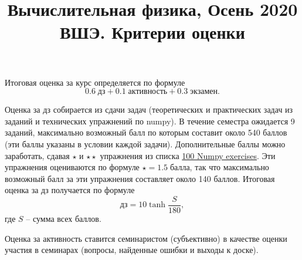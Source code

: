 \documentclass[prb,papersize=a4paper,notitlepage]{revtex4-1}%
\begin{document}
\title{Вычислительная физика, Осень 2020 ВШЭ. Критерии оценки}
\maketitle
Итоговая оценка за курс определяется по формуле $$0.6\;\textrm{дз} + 0.1\;\textrm{активность} + 0.3\;\textrm{экзамен}.$$

Оценка за дз собирается из сдачи задач (теоретических и практических задач из заданий и технических упражнений по numpy). В течение семестра ожидается 9 заданий, максимально возможный балл по которым составит около 540 баллов (эти баллы указаны в условии каждой задачи). Дополнительные баллы можно заработать, сдавая $\star$ и $\star\star$ упражнения из списка \href{https://github.com/rougier/numpy-100/blob/master/100_Numpy_exercises.md}{100 Numpy exercises}. Эти упражнения оцениваются по формуле $\star = 1.5 \;\textrm{балла}$, так что максимально возможный балл за эти упражнения составляет около 140 баллов. Итоговая оценка за дз получается по формуле $$\textrm{дз} = 10\tanh\frac{S}{180},$$ где $S$ -- сумма всех баллов.

Оценка за активность ставится семинаристом (субъективно) в качестве оценки участия в семинарах (вопросы, найденные ошибки и выходы к доске).
\end{document}
